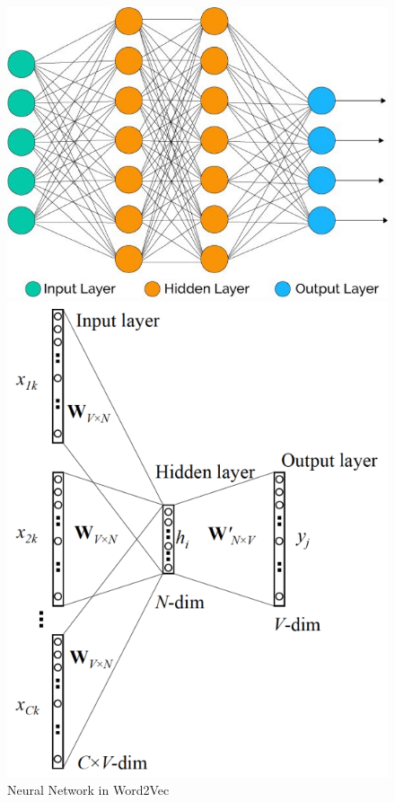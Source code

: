 \documentclass[a4paper, 12pt,notitlepage]{article} %
\newenvironment{figurecenter}{%
	\setlength\topsep{-7pt}
	\setlength\parskip{-7pt}
	\singlespacing %
	\begin{center}
	}{%
	\end{center}
\vspace{-5pt}
}
\numberwithin{dummy}{subsection}
\numberwithin{dummy}{section}
\theoremstyle{named}
\theoremstyle{definition}
\theoremstyle{definition}
\begin{document}
\begin{figure}[H]
	\begin{figurecenter}
	\begin{minipage}{.6\textwidth}
		\centering
		\includegraphics[scale=0.68]{image6.png}
	\end{minipage}%
	\begin{minipage}{.4\textwidth}
		\centering
		\includegraphics[scale=0.68]{image7.png}
	\end{minipage}
	\caption{Neural Network in Word2Vec \cite{towards, cbow}}
	\label{gamma}
	\end{figurecenter}
\end{figure}
\end{document}
